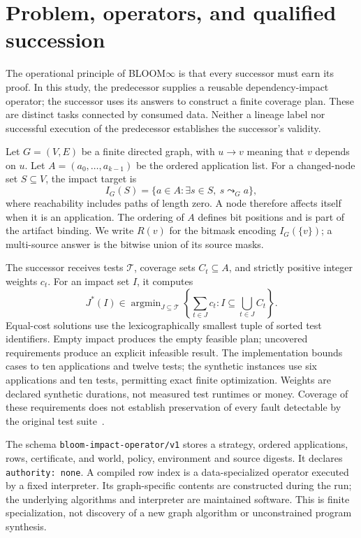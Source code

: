 \section{Problem, operators, and qualified succession}
\label{sec:bloom-formal}

The operational principle of \textsc{BLOOM}$\infty$ is that every successor must earn its proof. In this study, the predecessor supplies a reusable dependency-impact operator; the successor uses its answers to construct a finite coverage plan. These are distinct tasks connected by consumed data. Neither a lineage label nor successful execution of the predecessor establishes the successor's validity.

Let $G=(V,E)$ be a finite directed graph, with $u\to v$ meaning that $v$ depends on $u$. Let $A=(a_0,\ldots,a_{k-1})$ be the ordered application list. For a changed-node set $S\subseteq V$, the impact target is
\begin{equation}
 I_G(S)=\{a\in A:\exists s\in S,\ s\leadsto_G a\},
\end{equation}
where reachability includes paths of length zero. A node therefore affects itself when it is an application. The ordering of $A$ defines bit positions and is part of the artifact binding. We write $R(v)$ for the bitmask encoding $I_G(\{v\})$; a multi-source answer is the bitwise union of its source masks.

The successor receives tests $\mathcal{T}$, coverage sets $C_t\subseteq A$, and strictly positive integer weights $c_t$. For an impact set $I$, it computes
\begin{equation}
 J^*(I)\in\mathop{\arg\min}_{J\subseteq\mathcal{T}}
 \left\{\sum_{t\in J}c_t:I\subseteq\bigcup_{t\in J}C_t\right\}.
\end{equation}
Equal-cost solutions use the lexicographically smallest tuple of sorted test identifiers. Empty impact produces the empty feasible plan; uncovered requirements produce an explicit infeasible result. The implementation bounds cases to ten applications and twelve tests; the synthetic instances use six applications and ten tests, permitting exact finite optimization. Weights are declared synthetic durations, not measured test runtimes or money. Coverage of these requirements does not establish preservation of every fault detectable by the original test suite~\cite{rothermel1997safe,harrold1993reduction}.

The schema \texttt{bloom-impact-operator/v1} stores a strategy, ordered applications, rows, certificate, and world, policy, environment and source digests. It declares \texttt{authority: none}. A compiled row index is a data-specialized operator executed by a fixed interpreter. Its graph-specific contents are constructed during the run; the underlying algorithms and interpreter are maintained software. This is finite specialization, not discovery of a new graph algorithm or unconstrained program synthesis.

